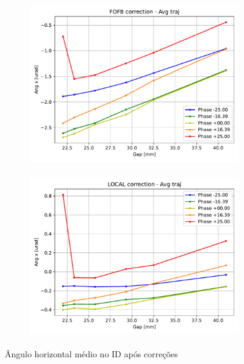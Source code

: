 \documentclass[a4paper,12pt]{article}
\begin{document}
\begin{figure}[H]
\begin{subfigure}{0.5\textwidth}
\includegraphics[width=0.9\linewidth, height=7cm]{figs/FOFB-avg-angx.pdf} 
\label{fig:subimfofbangx}
\end{subfigure}
\begin{subfigure}{0.5\textwidth}
\includegraphics[width=0.9\linewidth, height=7cm]{figs/LOCAL-avg-angx.pdf}
\label{fig:subimlocalangx}
\end{subfigure}
\caption{Ângulo horizontal médio no ID após correções}
\label{fig:angx}
\end{figure}
\end{document}
